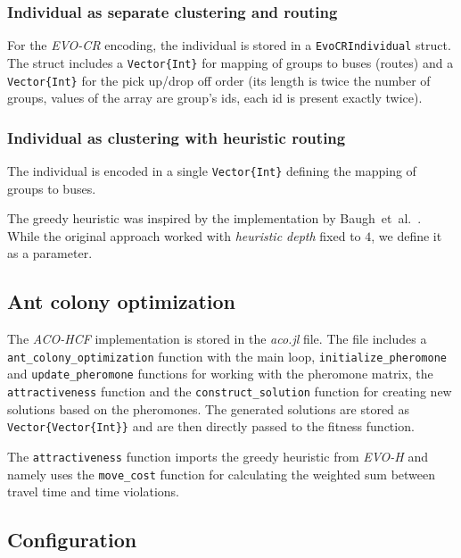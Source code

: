 \subsubsection{Individual as separate clustering and routing}

For the \textit{EVO-CR} encoding, the individual is stored in a \texttt{EvoCRIndividual} struct. The struct includes a \texttt{Vector\{Int\}} for mapping of groups to buses (routes) and a \texttt{Vector\{Int\}} for the pick up/drop off order (its length is twice the number of groups, values of the array are group's ids, each id is present exactly twice).

\subsubsection{Individual as clustering with heuristic routing}

The individual is encoded in a single \texttt{Vector\{Int\}} defining the mapping of groups to buses.

The greedy heuristic was inspired by the implementation by Baugh~et~al.~\cite{Baugh1998INTRACTABILITYOT}. While the original approach worked with \textit{heuristic depth} fixed to $4$, we define it as a parameter.

\subsection{Ant colony optimization}

The \textit{ACO-HCF} implementation is stored in the \textit{aco.jl} file. The file includes a \texttt{ant\_colony\_optimization} function with the main loop, \texttt{initialize\_pheromone} and \texttt{update\_pheromone} functions for working with the pheromone matrix, the \texttt{attractiveness} function and the \texttt{construct\_solution} function for creating new solutions based on the pheromones. The generated solutions are stored as \texttt{Vector\{Vector\{Int\}\}} and are then directly passed to the fitness function.

The \texttt{attractiveness} function imports the greedy heuristic from \textit{EVO-H} and namely uses the \texttt{move\_cost} function for calculating the weighted sum between travel time and time violations.

\subsection{Configuration}

